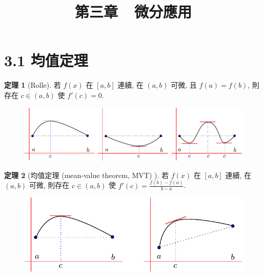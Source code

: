 \documentclass[12pt]{extarticle}
\newcommand{\ds}{\displaystyle}
\theoremstyle{definition}
\newtheorem*{thm}{定理}
\begin{document}
\title{\texorpdfstring{\vspace{-16mm} 第三章\ \ 微分應用}{第三章\ \ 微分應用}} 
\author{\vspace{-5em}}
\date{\vspace{-5em}}
\maketitle
\thispagestyle{firststyle}

\section*{3.1 均值定理}

\begin{thm}[Rolle]
  若 $f(x)$ 在 $[a, b]$ 連續, 在 $(a, b)$ 可微, 且 $f(a) = f(b)$, 則存在 $\ds c\in (a, b)$ 使 $\ds f'(c)=0$. 
\end{thm}
\vspace{-7mm}
\begin{figure}[!htbp]
  \centering
  \includegraphics[scale=1,page=1]{fig/rolle.pdf}
\end{figure}

\begin{thm}[均值定理 (mean-value theorem, MVT) ]
  若 $f(x)$ 在 $[a, b]$ 連續, 在 $(a, b)$ 可微, 則存在 $\ds c\in (a, b)$ 使 $\ds f'(c) = \frac{f(b) - f(a)}{b - a}$. 
\end{thm}
\vspace{-1cm}
\begin{figure}[!htbp]
  \centering
  \includegraphics[scale=1,page=1]{fig/rolle_to_mvt.pdf}
\end{figure}
\end{document}

